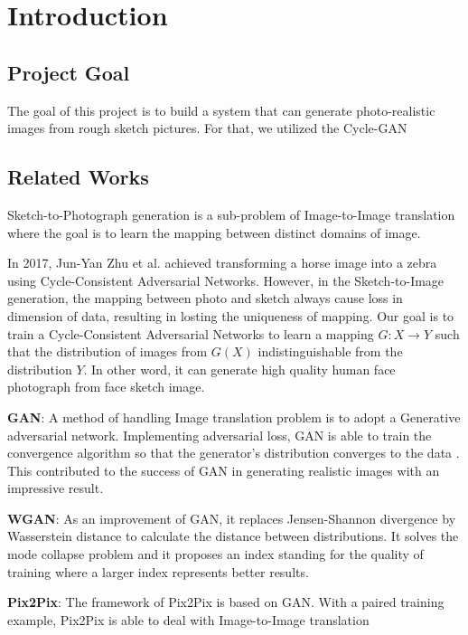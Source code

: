 \chapter{Introduction}\label{Ch:Introduction}

\section{Project Goal}

The goal of this project is to build a system that can generate photo-realistic images from rough sketch pictures. For that, we utilized the Cycle-GAN~\cite{CycleGAN} 

\section{Related Works}

Sketch-to-Photograph generation is a sub-problem of Image-to-Image translation where the goal is to learn the mapping between distinct domains of image. 

In 2017, Jun-Yan Zhu et al. achieved transforming a horse image into a zebra using Cycle-Consistent Adversarial Networks. However, in the Sketch-to-Image generation, the mapping between photo and sketch always cause loss in dimension of data, resulting in losting the uniqueness of mapping. Our goal is to train a Cycle-Consistent Adversarial Networks to learn a mapping \(G:X \rightarrow Y\) such that the distribution of images from \(G(X)\) indistinguishable from the distribution \(Y\). In other word, it can generate high quality human face photograph from face sketch image.

\textbf{GAN}: A method of handling Image translation problem is to adopt a Generative adversarial network. Implementing adversarial loss, GAN is able to train the convergence algorithm so that the generator's distribution converges to the data\cite{GANs0} . This contributed to the success of GAN in generating realistic images with an impressive result. 

\textbf{WGAN}: As an improvement of GAN, it replaces Jensen-Shannon divergence by Wasserstein distance to calculate the distance between distributions. It solves the mode collapse problem and it proposes an index standing for the quality of training where a larger index represents better results.

\textbf{Pix2Pix}: The framework of Pix2Pix is based on GAN. With a paired training example, Pix2Pix is able to deal with Image-to-Image translation 

